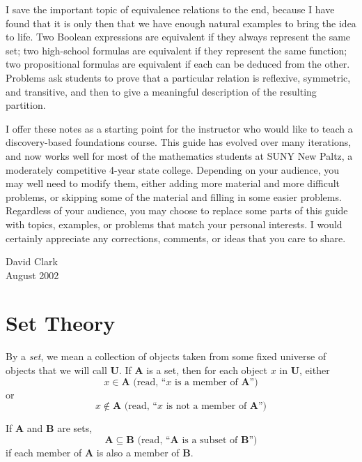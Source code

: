 \documentclass{article}
\newcommand\A{\mathbf A}
\newcommand\B{\mathbf B}
\newcommand\U{\mathbf U}
\newcommand{\0}{\mathbf 0}
\newcommand{\1}{\mathbf 1}
\begin{document}
I save the important topic of equivalence relations to the end, because I have found that it is only then that we have enough natural examples to bring the idea to life. Two Boolean expressions are equivalent if they always represent the same set; two high-school formulas are equivalent if they represent the same function; two propositional formulas are equivalent if each can be deduced from the other. Problems ask students to prove that a particular relation is reflexive, symmetric, and transitive, and then to give a meaningful description of the resulting partition.

I offer these notes as a starting point for the instructor who would like to teach a discovery-based foundations course. This guide has evolved over many iterations, and now works well for most of the mathematics students at SUNY New Paltz, a moderately competitive 4-year state college. Depending on your audience, you may well need to modify them, either adding more material and more difficult problems, or skipping some of the material and filling in some easier problems. Regardless of your audience, you may choose to replace some parts of this guide with topics, examples, or problems that match your personal interests. I would certainly appreciate any corrections, comments, or ideas that you care to share.

\begin{flushright}
David Clark
\\ August 2002
\end{flushright}




\newpage

\section{Set Theory}



By a \emph{set}, we mean a collection of objects taken from some fixed universe of objects that we will call $\U$. If $\A$ is a set, then for each object $x$ in $\U$, either
\begin{equation*}
x \in \A \text{ (read, ``$x$ is a member of $\A$'')}
\end{equation*}
or
\begin{equation*}
x \notin \A \text{ (read, ``$x$ is not a member of $\A$'')}
\end{equation*}

If $\A$ and $\B$ are sets,
\begin{equation*}
\A \subseteq \B \text{ (read, ``$\A$ is a subset of $\B$'')}
\end{equation*}
if each member of $\A$ is also a member of $\B$.
\end{document}
